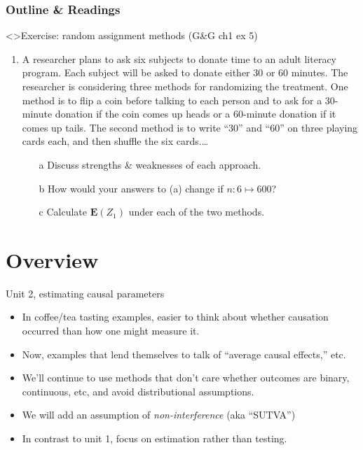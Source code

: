   \begin{frame}
    \frametitle{Outline \& Readings}

\tableofcontents[subsectionstyle=show/hide/hide]

\end{frame}


\begin{frame}<\nottheirhandout>{Exercise: random assignment methods}
{\footnotesize (G\&G ch1 ex 5)}

\begin{enumerate} \addtocounter{enumi}{-1}
\item
A researcher plans to ask six subjects to donate time to an adult
literacy program. Each subject will be asked to donate either 30 or 60
minutes. The researcher is considering three methods for randomizing
the treatment. One method is to flip a coin before talking to each
person and to ask for a 30-minute donation if the coin comes up heads
or a 60-minute donation if it comes up tails. The second method is to
write ``30'' and ``60'' on three playing cards each, and then shuffle
the six cards.\ldots
  
\begin{itemize}
\item[a] Discuss strengths \& weaknesses of each approach.
\item[b] How would your answers to (a) change if $n: 6 \mapsto 600$?
\item[c] Calculate $\mathbf{E}(Z_{1})$ under each of the two methods.
\end{itemize}
\end{enumerate}

\end{frame}

\section{Overview}



\begin{frame}{Unit 2, estimating causal parameters}
  \begin{itemize}
  \item In coffee/tea tasting examples, easier to think about whether causation occurred than how one might measure it.
  \item Now, examples that lend themselves to talk of ``average causal effects,'' etc.
  \item We'll continue to use methods that don't care whether outcomes
    are binary, continuous, etc, and avoid distributional assumptions.
  \item We will add an assumption of \textit{non-interference} (aka ``SUTVA'')
  \item In contrast to unit 1, focus on estimation rather than testing.
  \end{itemize}
\end{frame}

